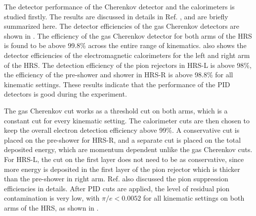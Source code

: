 The detector performance of the Cherenkov detector and the calorimeters is studied firstly. The results are discussed in details in Ref. \cite{Cummings2013}, and are briefly summarized here. The detector efficiencies of the gas Cherenkov detectors are shown in . The efficiency of the gas Cherenkov detector for both arms of the HRS is found to be above 99.8\% across the entire range of kinematics.  also shows the detector efficiencies of the electromagnetic calorimeters for the left and right arm of the HRS. The detection efficiency of the pion rejectors in HRS-L is above 98\%, the efficiency of the pre-shower and shower in HRS-R is above 98.8\% for all kinematic settings. These results indicate that the performance of the PID detectors is good during the experiment.

The gas Cherenkov cut works as a threshold cut on both arms, which is a constant cut for every kinematic setting. The calorimeter cuts are then chosen to keep the overall electron detection efficiency above 99\%. A conservative cut is placed on the pre-shower for HRS-R, and a separate cut is placed on the total deposited energy, which are momentum dependent unlike the gas Cherenkov cuts. For HRS-L, the cut on the first layer does not need to be as conservative, since more energy is deposited in the first layer of the pion rejector which is thicker than the pre-shower in right arm. Ref. \cite{Cummings2013} also discussed the pion suppression efficiencies in details. After PID cuts are applied, the level of residual pion contamination is very low, with $\pi/e<0.0052$ for all kinematic settings on both arms of the HRS, as shown in .

